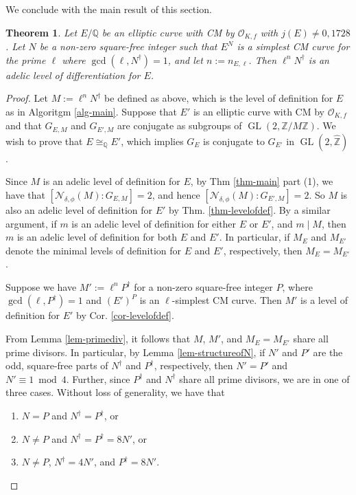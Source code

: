 \documentclass[11pt]{amsart}
\newtheorem{theorem}[defn]{Theorem}
\theoremstyle{definition}
\newcommand{\Q}{\mathbb{Q}}
\newcommand{\Z}{\mathbb{Z}}
\newcommand{\Of}{\mathcal{O}_{K,f}}
\newcommand{\GL}{\operatorname{GL}}
\begin{document}
We conclude with the main result of this section.

\begin{theorem}
    Let $E/\Q$ be an elliptic curve with CM by $\Of$ with $j(E) \neq 0, 1728$. Let $N$ be a non-zero square-free integer such that $E^N$ is a simplest CM curve for the prime $\ell$ where $\gcd(\ell, N^{\dagger}) = 1$, and let $n := n_{E, \ell}$. Then $\ell^n N^{\dagger}$ is an adelic level of differentiation for $E$.
\end{theorem}

\begin{proof}

    Let $M := \ell^n N^{\dagger}$ be defined as above, which is the level of definition for $E$ as in Algoritgm \ref{alg-main}. Suppose that $E'$ is an elliptic curve with CM by $\Of$ and that $G_{E, M}$ and $G_{E',M}$ are conjugate as subgroups of $\GL(2, \Z/M\Z)$. We wish to prove that $E \cong_{\Q} E'$, which implies $G_{E}$ is conjugate to $G_{E'}$ in $\GL(2, \widehat{\Z})$.

    Since $M$ is an adelic level of definition for $E$, by Thm \ref{thm-main} part (1), we have that $[\mathcal{N}_{\delta, \phi}(M) : G_{E,M}] = 2$, and hence $[\mathcal{N}_{\delta, \phi}(M) : G_{E',M}] = 2$. So $M$ is also an adelic level of definition for $E'$ by Thm. \ref{thm-levelofdef}. By a similar argument, if $m$ is an adelic level of definition for either $E$ or $E'$, and $m \mid M$, then $m$ is an adelic level of definition for both $E$ and $E'$. In particular, if $M_E$ and $M_{E'}$ denote the minimal levels of definition for $E$ and $E'$, respectively, then $M_E = M_{E'}$.
    
    Suppose we have $M' := \ell^n P^{\dagger}$ for a non-zero square-free integer $P$, where $\gcd(\ell, P^{\dagger}) = 1$ and $(E')^P$ is an $\ell$-simplest CM curve. Then $M'$ is a level of definition for $E'$ by Cor. \ref{cor-levelofdef}.

    From Lemma \ref{lem-primediv}, it follows that $M$, $M'$, and $M_{E} = M_{E'}$ share all prime divisors. In particular, by Lemma \ref{lem-structureofN}, if $N'$ and $P'$ are the odd, square-free parts of $N^{\dagger}$ and $P^{\dagger}$, respectively, then  $N' = P'$ and $N' \equiv 1 \bmod 4$. Further, since $P^{\dagger}$ and $N^{\dagger}$ share all prime divisors, we are in one of three cases. Without loss of generality, we have that
    \begin{enumerate}
        \item $N = P$ and $N^{\dagger} = P^{\dagger}$, or
        \item $N \neq P$ and $N^{\dagger} = P^{\dagger} = 8 N'$, or
        \item $N \neq P$, $N^{\dagger} = 4 N'$, and $P^{\dagger} = 8 N'$.
    \end{enumerate}
    

\end{proof}
\end{document}
